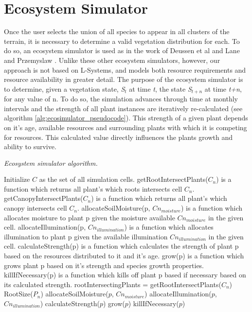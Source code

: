 \section{Ecosystem Simulator} \label{sec:ecosystem_simulator}

Once the user selects the union of all species to appear in all clusters of the terrain, it is necessary to determine a valid vegetation distribution for each. To do so, an ecosystem simulator is used as in the work of Deussen et al \cite{Deussen1998} and Lane and Przemyslaw \cite{Lane2002}. Unlike these other ecosystem simulators, however, our approach is not based on L-Systems, and models both resource requirements and resource availability in greater detail. The purpose of the ecosystem simulator is to determine, given a vegetation state, \textit{S$_{t}$} at time \textit{t}, the state \textit{S$_{t+n}$} at time \textit{t+n}, for any value of n. To do so, the simulation advances through time at monthly intervals and the strength of all plant instances are iteratively re-calculated (see algorithm \ref{alg:ecosimulator_pseudocode}). This strength of a given plant depends on it's age, available resources and surrounding plants with which it is competing for resources. This calculated value directly influences the plants growth and ability to survive.\\

\begin{algorithm}
\caption{\textit{Ecosystem simulator algorithm.}}
\begin{algorithmic}[1]
\REQUIRE Initialize $C$ as the set of all simulation cells.
\REQUIRE getRootIntersectPlants($C_{n}$) is a function which returns all plant's which roots intersects cell 
$C_{n}$.
\REQUIRE getCanopyIntersectPlants($C_{n}$) is a function which returns all plant's which canopy intersects cell $C_{n}$.
\REQUIRE allocateSoilMoisture(p, $Cn_{moisture}$) is a function which allocates moisture to plant p given the moisture available $Cn_{moisture}$ in the given cell.
\REQUIRE allocateIllumination(p, $Cn_{illumination}$) is a function which allocates illumination to plant p given the available illumination $Cn_{illumination}$ in the given cell.
\REQUIRE calculateStrength(p) is a function which calculates the strength of plant p based on the resources distributed to it and it's age.
\REQUIRE grow(p) is a function which grows plant p based on it's strength and species growth properties.
\REQUIRE killIfNecessary(p) is a function which kills off plant p based if necessary based on its calculated strength.
	\STATE rootIntersectingPlants = getRootIntersectPlants($C_{n}$) RootSize($P_{n}$)
		\STATE allocateSoilMoisture($p$, $Cn_{moisture}$)
		\STATE allocateIllumination($p$, $Cn_{illumination}$)
		\STATE calculateStrength($p$) 
	\ENDFOR
\ENDFOR
{}
		\STATE grow($p$)
		\STATE killIfNecessary($p$)
	\ENDFOR
\ENDFOR
\end{algorithmic}
\label{alg:ecosimulator_pseudocode}
\end{algorithm}


